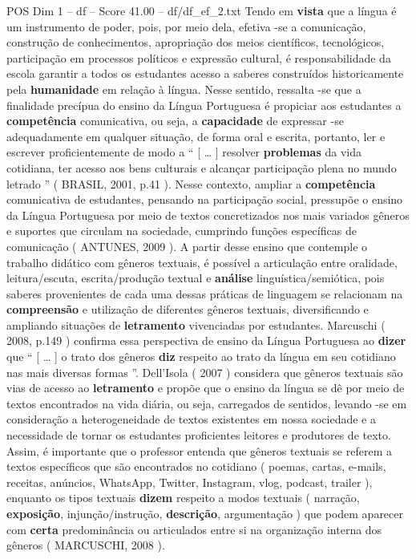 \begin{textsample}{POS Dim 1 – df – Score 41.00 – df/df\_ef\_2.txt}
Tendo em \textbf{vista} que a língua é um instrumento de poder, pois, por meio dela, efetiva -se a comunicação, construção de conhecimentos, apropriação dos meios científicos, tecnológicos, participação em processos políticos e expressão cultural, é responsabilidade da escola garantir a todos os estudantes acesso a saberes construídos historicamente pela \textbf{humanidade} em relação à língua.
Nesse sentido, ressalta -se que a finalidade precípua do ensino da Língua Portuguesa é propiciar aos estudantes a \textbf{competência} comunicativa, ou seja, a \textbf{capacidade} de expressar -se adequadamente em qualquer situação, de forma oral e escrita, portanto, ler e escrever proficientemente de modo a “ [ … ] resolver \textbf{problemas} da vida cotidiana, ter acesso aos bens culturais e alcançar participação plena no mundo letrado ” ( BRASIL, 2001, p.41 ).
Nesse contexto, ampliar a \textbf{competência} comunicativa de estudantes, pensando na participação social, pressupõe o ensino da Língua Portuguesa por meio de textos concretizados nos mais variados gêneros e suportes que circulam na sociedade, cumprindo funções específicas de comunicação ( ANTUNES, 2009 ).
A partir desse ensino que contemple o trabalho didático com gêneros textuais, é possível a articulação entre oralidade, leitura/escuta, escrita/produção textual e \textbf{análise} linguística/semiótica, pois saberes provenientes de cada uma dessas práticas de linguagem se relacionam na \textbf{compreensão} e utilização de diferentes gêneros textuais, diversificando e ampliando situações de \textbf{letramento} vivenciadas por estudantes.
Marcuschi ( 2008, p.149 ) confirma essa perspectiva de ensino da Língua Portuguesa ao \textbf{dizer} que “ [ … ] o trato dos gêneros \textbf{diz} respeito ao trato da língua em seu cotidiano nas mais diversas formas ”.
Dell’Isola ( 2007 ) considera que gêneros textuais são vias de acesso ao \textbf{letramento} e propõe que o ensino da língua se dê por meio de textos encontrados na vida diária, ou seja, carregados de sentidos, levando -se em consideração a heterogeneidade de textos existentes em nossa sociedade e a necessidade de tornar os estudantes proficientes leitores e produtores de texto.
Assim, é importante que o professor entenda que gêneros textuais se referem a textos específicos que são encontrados no cotidiano ( poemas, cartas, e-mails, receitas, anúncios, WhatsApp, Twitter, Instagram, vlog, podcast, trailer ), enquanto os tipos textuais \textbf{dizem} respeito a modos textuais ( narração, \textbf{exposição}, injunção/instrução, \textbf{descrição}, argumentação ) que podem aparecer com \textbf{certa} predominância ou articulados entre si na organização interna dos gêneros ( MARCUSCHI, 2008 ).

\end{textsample}
